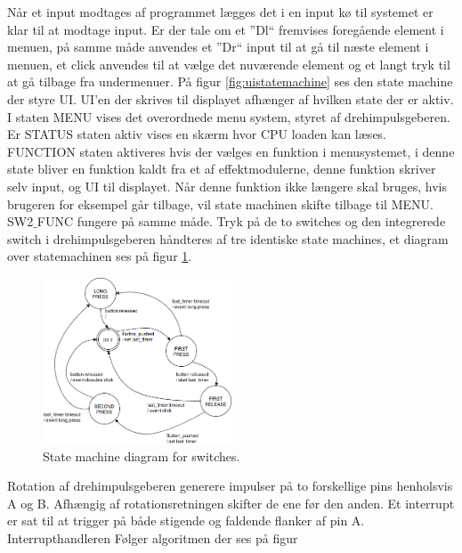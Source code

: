 Når et input  modtages af programmet lægges det i en input kø til systemet er klar til at modtage input. Er der tale om et ''Dl`` fremvises foregående element i menuen, på samme måde anvendes et ''Dr`` input til at gå til næste element i menuen, et click anvendes til at vælge det nuværende element og et langt tryk til at gå tilbage fra undermenuer.
På figur \ref{fig:uistatemachine} ses den state machine der styre UI.
UI'en der skrives til displayet afhænger af hvilken state der er aktiv.
I staten MENU vises det overordnede menu system, styret af drehimpulsgeberen. 
Er STATUS staten aktiv vises en skærm hvor CPU loaden kan læses.
FUNCTION staten aktiveres hvis der vælges en funktion i menusystemet, i denne state bliver en funktion kaldt fra et af effektmodulerne, denne funktion skriver selv input, og  UI til displayet.
Når denne funktion ikke længere skal bruges, hvis brugeren for eksempel går tilbage, vil state machinen skifte tilbage til MENU.
SW2$\_$FUNC fungere på samme måde. \newline
Tryk på de to switches og den integrerede switch i drehimpulsgeberen håndteres af tre identiske state machines, et diagram over statemachinen ses på figur \ref{fig:SW_statemachine}.
\begin{figure}[!ht]
	\centering 
	\includegraphics[width=0.5\textwidth]{billeder/buttons_statemachine.png} 
	\caption{State machine diagram for switches. } 
	\label{fig:SW_statemachine} 
\end{figure}
Rotation af drehimpulsgeberen generere impulser på to forskellige pins henholsvis A og B.
Afhængig af rotationsretningen skifter de ene før den anden. 
Et interrupt er sat til at trigger på både stigende og faldende flanker af pin A.
Interrupthandleren Følger algoritmen der ses på figur
